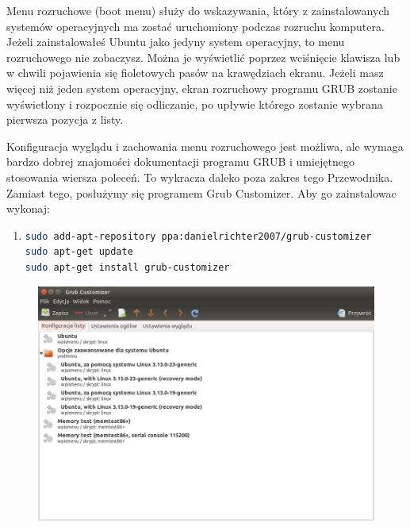 Menu rozruchowe (boot menu) służy do wskazywania, który z zainstalowanych systemów operacyjnych ma zostać uruchomiony podczas rozruchu komputera. Jeżeli zainstalowałeś Ubuntu jako jedyny system operacyjny, to menu rozruchowego nie zobaczysz. Można je wyświetlić poprzez wciśnięcie klawisza  lub \keys{\arrowkeydown} w chwili pojawienia się fioletowych pasów na krawędziach ekranu. Jeżeli masz więcej niż jeden system operacyjny, ekran rozruchowy programu GRUB zostanie wyświetlony i rozpocznie się odliczanie, po upływie którego zostanie wybrana pierwsza pozycja z listy.

Konfiguracja wyglądu i zachowania menu rozruchowego jest możliwa, ale wymaga bardzo dobrej znajomości dokumentacji programu GRUB i umiejętnego stosowania wiersza poleceń. To wykracza daleko poza zakres tego Przewodnika. Zamiast tego, posłużymy się programem \textcolor{ubuntu_orange}{Grub Customizer}. Aby go zainstalowac wykonaj:
\begin{enumerate}
\item
\begin{lstlisting}[language=bash]
sudo add-apt-repository ppa:danielrichter2007/grub-customizer
sudo apt-get update
sudo apt-get install grub-customizer
\end{lstlisting}
\end{enumerate}

\begin{figure}
	\vspace{-10pt}
	\includegraphics[width=\linewidth]{images/programy_grub_customizer.png}
\end{figure}


